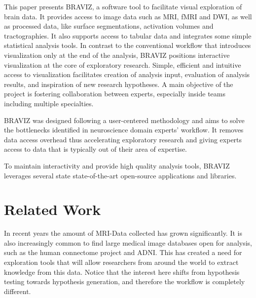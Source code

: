 \documentclass[utf8]{frontiersSCNS} %
\begin{document}
This paper presents BRAVIZ, a software tool to facilitate visual exploration of brain data. It provides access to image data such as MRI, fMRI and DWI, as well as processed data, like surface segmentations, activation volumes and tractographies. It also supports access to tabular data and integrates some simple statistical analysis tools. In contrast to the conventional workflow that introduces visualization only at the end of the analysis, BRAVIZ positions interactive visualization at the core of exploratory research. Simple, efficient and intuitive access to visualization facilitates creation of analysis input, evaluation of analysis results, and inspiration of new research hypotheses. A main objective of the project is fostering collaboration between experts, especially inside teams including multiple specialties.

BRAVIZ was designed following a user-centered methodology and aims to solve the bottlenecks identified in neuroscience domain experts’ workflow. It removes data access overhead thus accelerating exploratory research and giving experts access to data that is typically out of their area of expertise.

To maintain interactivity and provide high quality analysis tools, BRAVIZ leverages several state state-of-the-art open-source applications and libraries.  

%


\section{Related Work}

In recent years the amount of MRI-Data collected has grown significantly. It is also increasingly common to find large medical image databases open for analysis, such as the human connectome project\citep{rosen_human_2010} and ADNI\citep{jack_alzheimers_2008}. This has created a need for exploration tools that will allow researchers from around the world to extract knowledge from this data. Notice that the interest here shifts from hypothesis testing towards hypothesis generation, and therefore the workflow is completely different.
  
\end{document}
